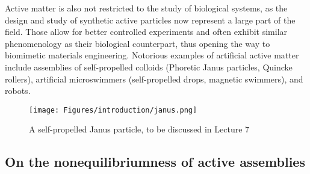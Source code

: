 Active matter is also not restricted to the study of biological systems, as the design and study of synthetic active particles now represent a large part of the field. Those allow for better controlled experiments and often exhibit similar phenomenology as their biological counterpart, thus opening the way to biomimetic materials engineering. 
Notorious examples of artificial active matter include assemblies of self-propelled colloids (Phoretic Janus particles, Quincke rollers), artificial microswimmers (self-propelled drops, magnetic swimmers), and robots.

\begin{figure}[!htb]
    \centering
    \texttt{[image: Figures/introduction/janus.png]}
    \caption{A self-propelled Janus particle, to be discussed in Lecture 7}
    \label{fig: janus}
\end{figure}



\subsection{On the nonequilibriumness of active assemblies}

